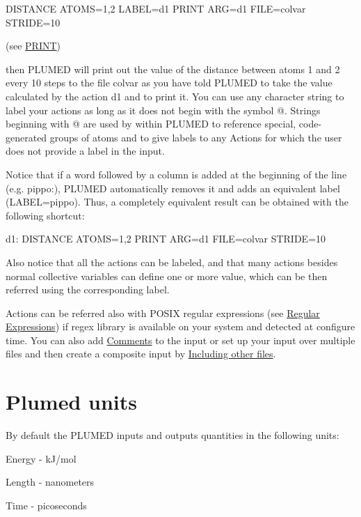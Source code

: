 \begin{DoxyVerb}DISTANCE ATOMS=1,2 LABEL=d1
PRINT ARG=d1 FILE=colvar STRIDE=10
\end{DoxyVerb}
 (see \hyperlink{PRINT}{P\+R\+I\+N\+T})

then P\+L\+U\+M\+E\+D will print out the value of the distance between atoms 1 and 2 every 10 steps to the file colvar as you have told P\+L\+U\+M\+E\+D to take the value calculated by the action d1 and to print it. You can use any character string to label your actions as long as it does not begin with the symbol @. Strings beginning with @ are used by within P\+L\+U\+M\+E\+D to reference special, code-\/generated groups of atoms and to give labels to any Actions for which the user does not provide a label in the input.

Notice that if a word followed by a column is added at the beginning of the line (e.\+g. pippo\+:), P\+L\+U\+M\+E\+D automatically removes it and adds an equivalent label (L\+A\+B\+E\+L=pippo). Thus, a completely equivalent result can be obtained with the following shortcut\+: \begin{DoxyVerb}d1: DISTANCE ATOMS=1,2
PRINT ARG=d1 FILE=colvar STRIDE=10
\end{DoxyVerb}


Also notice that all the actions can be labeled, and that many actions besides normal collective variables can define one or more value, which can be then referred using the corresponding label.

Actions can be referred also with P\+O\+S\+I\+X regular expressions (see \hyperlink{Regex}{Regular Expressions}) if regex library is available on your system and detected at configure time. You can also add \hyperlink{comments}{Comments} to the input or set up your input over multiple files and then create a composite input by \hyperlink{includes}{Including other files}.\hypertarget{_syntax_units}{}\section{Plumed units}\label{_syntax_units}
By default the P\+L\+U\+M\+E\+D inputs and outputs quantities in the following units\+:


\begin{DoxyItemize}
\item Energy -\/ k\+J/mol
\item Length -\/ nanometers
\item Time -\/ picoseconds
\end{DoxyItemize}

